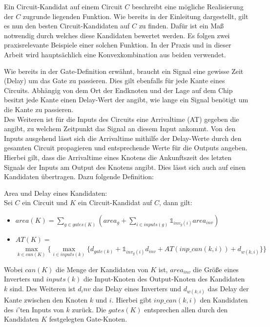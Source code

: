 \documentclass[11pt, a4paper, german]{article}
\begin{document}
Ein Circuit-Kandidat auf einem Circuit $C$ beschreibt eine mögliche Realisierung der $C$ zugrunde liegenden Funktion.  Wie bereits in der Einleitung dargestellt, gilt es nun den besten Circuit-Kandidaten auf $C$ zu finden. Dafür ist ein Maß notwendig durch welches diese Kandidaten bewertet werden. Es folgen zwei praxisrelevante Beispiele einer solchen Funktion. In der Praxis und in dieser Arbeit wird hauptsächlich eine Konvexkombination aus beiden verwendet.

Wie bereits in der Gate-Definition erwähnt, braucht ein Signal eine gewisse Zeit (Delay) um das Gate zu passieren. Dies gilt ebenfalls für jede Kante eines Circuits. Abhängig von dem Ort der Endknoten und der Lage auf dem Chip besitzt jede Kante einen Delay-Wert der angibt, wie lange ein Signal benötigt um die Kante zu passieren. \\
Des Weiteren ist für die Inputs des Circuits eine Arrivaltime (AT) gegeben die angibt, zu welchem Zeitpunkt das Signal an diesem Input ankommt. Von den Inputs ausgehend lässt sich die Arrivaltime mithilfe der Delay-Werte durch den gesamten Circuit propagieren und entsprechende Werte für die Outputs angeben. Hierbei gilt, dass die Arrivaltime eines Knotens die Ankunftszeit des letzten Signals der Inputs am Output des Knotens angibt. Dies lässt sich auch auf einen Kandidaten übertragen. Dazu folgende Definition:

\begin{definition}{Area und Delay eines Kandidaten:}\\
\label{def:area_delay}
Sei $C$ ein Circuit und $K$ ein Circuit-Kandidat auf $C$, dann gilt: \\
\begin{itemize}
\item $area(K) = \sum_{g \in gates(K)} (area_g + \sum_{i \in inputs(g)} \mathbb{1}_{inv_g(i)} area_{inv})$ 
\item $AT(K) = $\\$  \max\limits_{k \in can(K)} \{\max\limits_{i \in inputs(k)} \{   d_{gate(k)} + \mathbb{1}_{inv_g(i)} d_{inv} + AT(inp\_can(k,i)) + d_{w(k,i)} \} \}$ 
\end{itemize}
Wobei $can(K)$ die Menge der Kandidaten von $K$ ist, $area_{inv}$ die Größe eines Inverters und $inputs(k)$ die Input-Knoten des Output-Knoten des Kandidaten $k$ sind. Des Weiteren ist $d_inv$ das Delay eines Inverters und $d_{w(k,i)} $ das Delay der Kante zwischen den Knoten $k$ und $i$. Hierbei gibt $inp\_can(k,i)$ den Kandidaten des $i$'ten Inputs von $k$ zurück. 
Die $gates(K)$ entsprechen allen durch den Kandidaten $K$ festgelegten Gate-Knoten. 

\end{definition}
\end{document}
